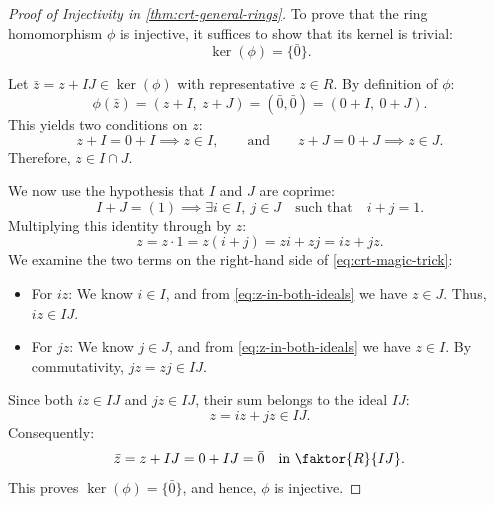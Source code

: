 \begin{content}
\begin{proof}[Proof of Injectivity in \cref{thm:crt-general-rings}]
To prove that the ring homomorphism $\phi$ is injective, it suffices to show that its kernel is trivial:
\[
\ker(\phi) = \{ \bar{0} \}.
\]

Let $\bar{z} = z + IJ \in \ker(\phi)$ with representative $z \in R$.
By definition of $\phi$:
\[
\phi(\bar{z}) = (z + I, \ z + J) = (\bar{0}, \bar{0}) = (0 + I, \ 0 + J).
\]
This yields two conditions on $z$:
\begin{equation}\label{eq:z-in-both-ideals}
z + I = 0 + I \implies z \in I, \qquad \text{and} \qquad z + J = 0 + J \implies z \in J.
\end{equation}
Therefore, $z \in I \cap J$.

We now use the hypothesis that $I$ and $J$ are coprime:
\[
I + J = (1) \implies \exists i \in I, \ j \in J \quad \text{such that} \quad i + j = 1.
\]
Multiplying this identity through by $z$:
\begin{equation}\label{eq:crt-magic-trick}
z = z \cdot 1 = z(i + j) = z i + z j = i z + j z.
\end{equation}
We examine the two terms on the right-hand side of \eqref{eq:crt-magic-trick}:
\begin{itemize}
    \item For $i z$: We know $i \in I$, and from \eqref{eq:z-in-both-ideals} we have $z \in J$. Thus, $i z \in I J$.
    \item For $j z$: We know $j \in J$, and from \eqref{eq:z-in-both-ideals} we have $z \in I$. By commutativity, $j z = z j \in I J$.
\end{itemize}
Since both $i z \in I J$ and $j z \in I J$, their sum belongs to the ideal $I J$:
\[
z = i z + j z \in I J.
\]
Consequently:
\[
\bar{z} = z + IJ = 0 + IJ = \bar{0} \quad \text{in } \faktor{R}{IJ}.
\]
This proves $\ker(\phi) = \{ \bar{0} \}$, and hence, $\phi$ is injective.
\end{proof}


\end{content}
